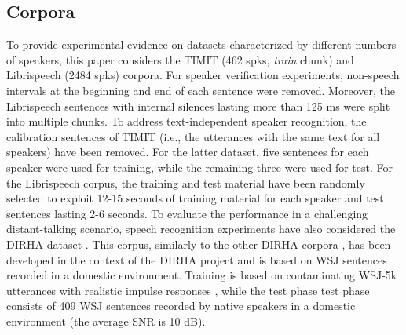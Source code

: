\documentclass{article}
\begin{document}
\subsection*{Corpora}
To provide experimental evidence on datasets characterized by different numbers of speakers, this paper considers the TIMIT (462 spks, \textit{train} chunk)  \cite{timit} and Librispeech  (2484 spks) \cite{librispeech} corpora. For speaker verification experiments, non-speech intervals at the beginning and end of each sentence were removed. Moreover, the Librispeech sentences with internal silences lasting more than 125 ms were split into multiple chunks. To address text-independent speaker recognition, the calibration sentences of TIMIT (i.e., the utterances with the same text for all speakers) have been removed. For the latter dataset, five sentences for each speaker were used for training, while the remaining three were used for test. For the Librispeech corpus, the training and test material have been randomly selected to exploit 12-15 seconds of training material for each speaker and test sentences lasting 2-6 seconds. To evaluate the performance in a challenging distant-talking scenario, speech recognition experiments have also considered the DIRHA dataset \cite{dirha_asru}. This corpus, similarly to the other DIRHA corpora \cite{dirha_grid,dirha_icassp}, has been developed in the context of the DIRHA project \cite{lrec} and is based on WSJ sentences \cite{wsj_corpus} recorded in a domestic environment. Training is based on contaminating WSJ-5k utterances with realistic impulse responses \cite{Ravanelli-12,rav_in14}, while the test phase test phase consists of 409 WSJ sentences recorded by native speakers in a domestic environment (the average SNR is 10 dB). 
\end{document}

